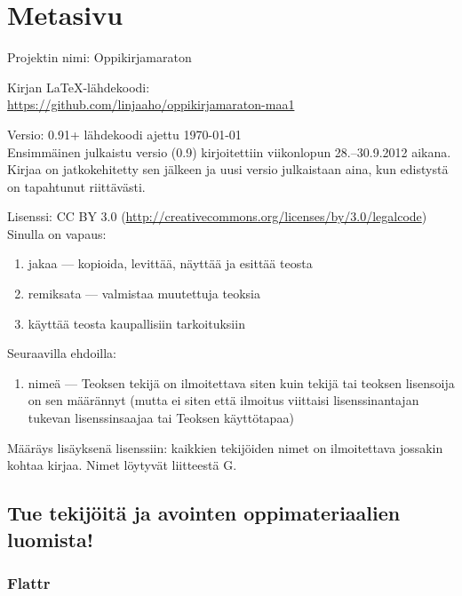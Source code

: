 \newpage

\section*{Metasivu}

Projektin nimi: Oppikirjamaraton

Kirjan LaTeX-lähdekoodi: \\
\url{https://github.com/linjaaho/oppikirjamaraton-maa1}

Versio: 0.91+ \qquad lähdekoodi ajettu \today \\
Ensimmäinen julkaistu versio (0.9) kirjoitettiin viikonlopun 28.--30.9.2012 aikana. Kirjaa on jatkokehitetty sen jälkeen ja uusi versio julkaistaan aina, kun edistystä on tapahtunut riittävästi.

Lisenssi: CC BY 3.0 (\url{http://creativecommons.org/licenses/by/3.0/legalcode})\\
Sinulla on vapaus:
\begin{enumerate}
\item jakaa — kopioida, levittää, näyttää ja esittää teosta
\item remiksata — valmistaa muutettuja teoksia
\item käyttää teosta kaupallisiin tarkoituksiin
\end{enumerate}
Seuraavilla ehdoilla:
\begin{enumerate}
\item nimeä — Teoksen tekijä on ilmoitettava siten kuin tekijä tai teoksen lisensoija on sen määrännyt (mutta ei siten että ilmoitus viittaisi lisenssinantajan tukevan lisenssinsaajaa tai Teoksen käyttötapaa)
\end{enumerate}

Määräys lisäyksenä lisenssiin: kaikkien tekijöiden nimet on ilmoitettava jossakin kohtaa kirjaa. Nimet löytyvät liitteestä G.

\subsection*{Tue tekijöitä ja avointen oppimateriaalien luomista!}

\subsubsection*{Flattr}


